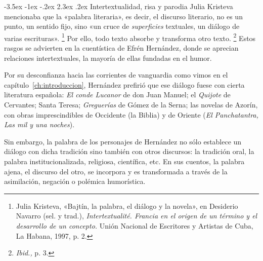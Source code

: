 \documentclass[14pt,twoside,final]{extbook} %
\makeatletter
\let\oldfootnote\footnote
\renewcommand\footnote[1]{%
\oldfootnote{\hspace{1mm}#1}}
\renewcommand\section{\@startsection {section}{1}{\z@}%
                                     {-3.5ex \@plus -1ex \@minus -.2ex}%
                                     {2.3ex \@plus .2ex}%
                                     {\normalfont\large\bfseries\sc}}
\makeatother
\begin{document}
\section{Intertextualidad, risa y parodia}\label{sec:intertextualidad-risa-parodia}
Julia Kristeva mencionaba que la «palabra literaria», es decir, el discurso literario, no es un punto, un sentido fijo, sino «un cruce de \emph{superficies} textuales, un diálogo de varias escrituras».\footnote{Julia Kristeva, «Bajtín, la palabra, el diálogo y la novela», en Desiderio Navarro (sel. y trad.), \emph{Intertextualité. Francia en el origen de un término y el desarrollo de un concepto.} Unión Nacional de Escritores y Artistas de Cuba, La Habana, 1997, p. 2.} Por ello, todo texto absorbe y transforma otro texto.\footnote{\emph{Ibid.,} p. 3.} Estos rasgos se advierten en la cuentística de Efrén Hernández, donde se aprecian relaciones intertextuales, la mayoría de ellas fundadas en el humor.

Por su desconfianza hacia las corrientes de vanguardia como vimos en el capítulo~\ref{ch:introduccion}, Hernández prefirió que ese diálogo fuese con cierta literatura española: \emph{El conde Lucanor} de don Juan Manuel; el \emph{Quijote} de Cervantes; Santa Teresa; \emph{Greguerías} de Gómez de la Serna; las novelas de Azorín, con obras imprescindibles de Occidente (la Biblia) y de Oriente (\textit{El Panchatantra, Las mil y una noches}).

Sin embargo, la palabra de los personajes de Hernández no sólo establece un diálogo con dicha tradición sino también con otros discursos: la tradición oral, la palabra institucionalizada, religiosa, científica, etc. En sus cuentos, la palabra ajena, el discurso del otro, se incorpora y es transformada a través de la asimilación, negación o polémica humorística.\protect\enlargethispage*{\baselineskip}
\end{document}
